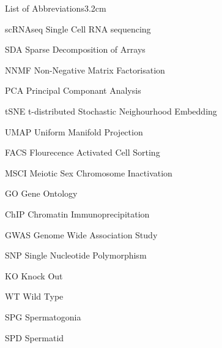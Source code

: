 \begin{mclistof}{List of Abbreviations}{3.2cm}

\item[scRNAseq] Single Cell RNA sequencing

\item[SDA] Sparse Decomposition of Arrays

\item[NNMF] Non-Negative Matrix Factorisation

\item[PCA] Principal Componant Analysis

\item[tSNE] t-distributed Stochastic Neighourhood Embedding

\item[UMAP] Uniform Manifold Projection

\item[FACS] Flourecence Activated Cell Sorting

\item[MSCI] Meiotic Sex Chromosome Inactivation

\item[GO] Gene Ontology

\item[ChIP] Chromatin Immunoprecipitation

\item[GWAS] Genome Wide Association Study

\item[SNP] Single Nucleotide Polymorphism

\item[KO] Knock Out

\item[WT] Wild Type

\item[SPG] Spermatogonia

\item[SPD] Spermatid

\end{mclistof} 
